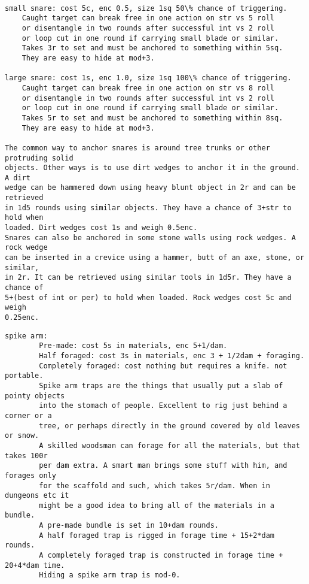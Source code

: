 \small \begin{verbatim}

small snare: cost 5c, enc 0.5, size 1sq 50\% chance of triggering.
    Caught target can break free in one action on str vs 5 roll
    or disentangle in two rounds after successful int vs 2 roll
    or loop cut in one round if carrying small blade or similar.
    Takes 3r to set and must be anchored to something within 5sq.
    They are easy to hide at mod+3.

large snare: cost 1s, enc 1.0, size 1sq 100\% chance of triggering.
    Caught target can break free in one action on str vs 8 roll
    or disentangle in two rounds after successful int vs 2 roll
    or loop cut in one round if carrying small blade or similar.
    Takes 5r to set and must be anchored to something within 8sq.
    They are easy to hide at mod+3.

The common way to anchor snares is around tree trunks or other protruding solid
objects. Other ways is to use dirt wedges to anchor it in the ground. A dirt
wedge can be hammered down using heavy blunt object in 2r and can be retrieved
in 1d5 rounds using similar objects. They have a chance of 3+str to hold when
loaded. Dirt wedges cost 1s and weigh 0.5enc.
Snares can also be anchored in some stone walls using rock wedges. A rock wedge
can be inserted in a crevice using a hammer, butt of an axe, stone, or similar,
in 2r. It can be retrieved using similar tools in 1d5r. They have a chance of
5+(best of int or per) to hold when loaded. Rock wedges cost 5c and weigh
0.25enc.

\end{verbatim} \pagebreak[1] \begin{verbatim}
spike arm:
        Pre-made: cost 5s in materials, enc 5+1/dam.
        Half foraged: cost 3s in materials, enc 3 + 1/2dam + foraging.
        Completely foraged: cost nothing but requires a knife. not portable.
        Spike arm traps are the things that usually put a slab of pointy objects
        into the stomach of people. Excellent to rig just behind a corner or a
        tree, or perhaps directly in the ground covered by old leaves or snow.
        A skilled woodsman can forage for all the materials, but that takes 100r
        per dam extra. A smart man brings some stuff with him, and forages only
        for the scaffold and such, which takes 5r/dam. When in dungeons etc it
        might be a good idea to bring all of the materials in a bundle.
        A pre-made bundle is set in 10+dam rounds.
        A half foraged trap is rigged in forage time + 15+2*dam rounds.
        A completely foraged trap is constructed in forage time + 20+4*dam time.
        Hiding a spike arm trap is mod-0.


\end{verbatim}
